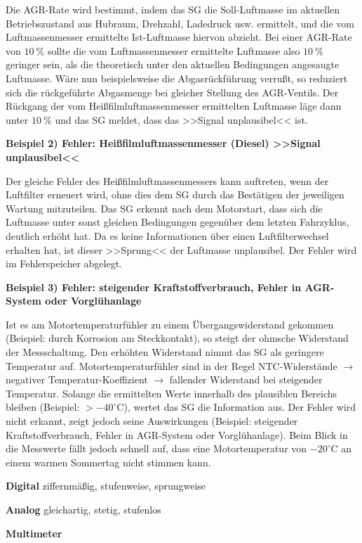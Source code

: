 Die AGR-Rate wird bestimmt, indem das SG die Soll-Luftmasse im aktuellen
Betriebszustand aus Hubraum, Drehzahl, Ladedruck usw. ermittelt, und die
vom Luftmassenmesser ermittelte Ist-Luftmasse hiervon abzieht. Bei einer
AGR-Rate von $10~\%$ sollte die vom Luftmassenmesser ermittelte
Luftmasse also $10~\%$ geringer sein, als die theoretisch unter den
aktuellen Bedingungen angesaugte Luftmasse. Wäre nun beispielsweise die
Abgasrückführung verrußt, so reduziert sich die rückgeführte Abgasmenge
bei gleicher Stellung des AGR-Ventils. Der Rückgang der vom
Heißfilmluftmassenmesser ermittelten Luftmasse läge dann unter $10~\%$
und das SG meldet, dass das >>Signal unplausibel<< ist.

\textbf{Beispiel 2) Fehler: Heißfilmluftmassenmesser (Diesel) >>Signal
unplausibel<<}

Der gleiche Fehler des Heißfilmluftmassenmessers kann auftreten, wenn
der Luftfilter erneuert wird, ohne dies dem SG durch das Bestätigen der
jeweiligen Wartung mitzuteilen. Das SG erkennt nach dem Motorstart, dass
sich die Luftmasse unter sonst gleichen Bedingungen gegenüber dem
letzten Fahrzyklus, deutlich erhöht hat. Da es keine Informationen über
einen Luftfilterwechsel erhalten hat, ist dieser >>Sprung<< der
Luftmasse unplausibel. Der Fehler wird im Fehlerspeicher abgelegt.

\textbf{Beispiel 3) Fehler: steigender Kraftstoffverbrauch, Fehler in
AGR-System oder Vorglühanlage}

Ist es am Motortemperaturfühler zu einem Übergangswiderstand gekommen
(Beispiel: durch Korrosion am Steckkontakt), so steigt der ohmsche
Widerstand der Messschaltung. Den erhöhten Widerstand nimmt das SG als
geringere Temperatur auf. Motortemperaturfühler sind in der Regel
NTC-Widerstände $\to$ negativer Temperatur-Koeffizient $\to$
fallender Widerstand bei steigender Temperatur. Solange die ermittelten
Werte innerhalb des plausiblen Bereichs bleiben (Beispiel:
$> -40^\circ\text{C}$), wertet das SG die Information aus. Der Fehler
wird nicht erkannt, zeigt jedoch seine Auswirkungen (Beispiel:
steigender Kraftstoffverbrauch, Fehler in AGR-System oder
Vorglühanlage). Beim Blick in die Messwerte fällt jedoch schnell auf,
dass eine Motortemperatur von $-20^\circ\text{C}$ an einem warmen
Sommertag nicht stimmen kann.

\textbf{Digital} ziffernmäßig, stufenweise, sprungweise

\textbf{Analog} gleichartig, stetig, stufenlos

\textbf{Multimeter}

